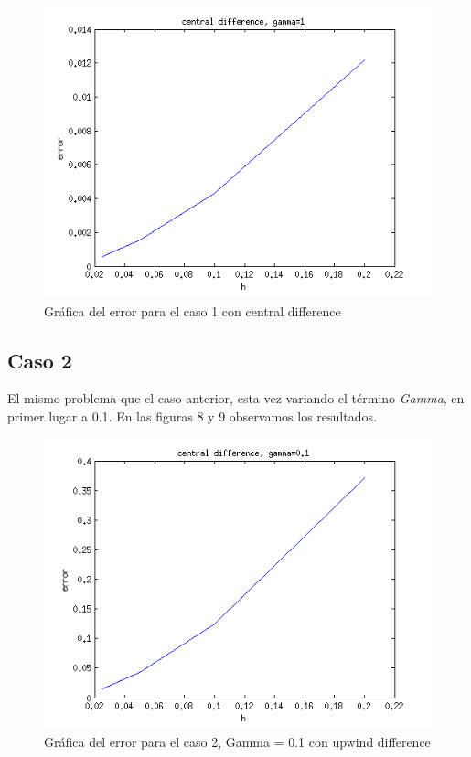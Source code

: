 \documentclass[11pt]{article}
\begin{document}
\begin{figure}[tbh]
	\centering
		\includegraphics[width=1.0\textwidth]{imagen7.png}
	\caption{Gr\'afica del error para el caso 1 con central difference}
	\label{fig:Fig1}
\end{figure}

\subsection{Caso 2}

El mismo problema que el caso anterior, esta vez variando el t\'ermino \textit{Gamma}, en primer lugar a 0.1. En las figuras 8 y 9 observamos los resultados.

\begin{figure}[tbh]
	\centering
		\includegraphics[width=1.0\textwidth]{imagen8.png}
	\caption{Gr\'afica del error para el caso 2, Gamma = 0.1 con upwind difference}
	\label{fig:Fig1}
\end{figure}
\end{document}
